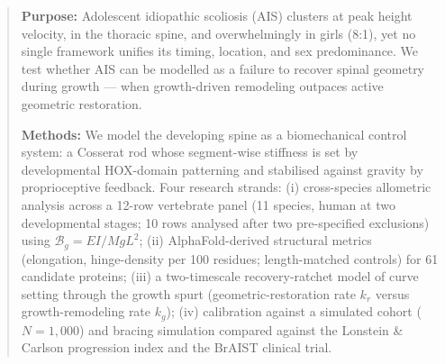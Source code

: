 \begin{abstract}
\noindent\textbf{Purpose:} Adolescent idiopathic scoliosis (AIS) clusters at peak height velocity, in the thoracic spine, and overwhelmingly in girls (8:1), yet no single framework unifies its timing, location, and sex predominance. We test whether AIS can be modelled as a failure to recover spinal geometry during growth --- when growth-driven remodeling outpaces active geometric restoration.

\noindent\textbf{Methods:} We model the developing spine as a biomechanical control system: a Cosserat rod whose segment-wise stiffness is set by developmental HOX-domain patterning and stabilised against gravity by proprioceptive feedback. Four research strands: (i) cross-species allometric analysis across a 12-row vertebrate panel (11 species, human at two developmental stages; 10 rows analysed after two pre-specified exclusions) using $\mathcal{B}_g = EI/MgL^2$; (ii) AlphaFold-derived structural metrics (elongation, hinge-density per 100 residues; length-matched controls) for 61 candidate proteins; (iii) a two-timescale recovery-ratchet model of curve setting through the growth spurt (geometric-restoration rate $k_r$ versus growth-remodeling rate $k_g$); (iv) calibration against a simulated cohort ($N=1,000$) and bracing simulation compared against the Lonstein \& Carlson progression index and the BrAIST clinical trial.


\end{abstract}
